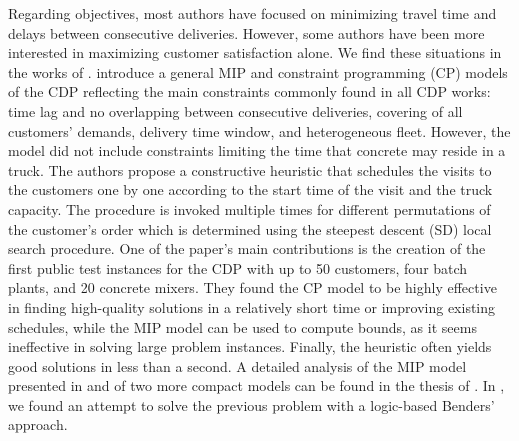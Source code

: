 \documentclass{article}
\begin{document}
Regarding objectives, most authors have focused on minimizing travel time and delays between consecutive deliveries. However, some authors have been more interested in maximizing customer satisfaction alone. We find these situations in the works of \cite{durbin2008or, kinable2014concrete, kinable2014logic, sulaman2017simulated}. \cite{kinable2014concrete} introduce a general MIP and constraint programming (CP) models of the CDP reflecting the main constraints commonly found in all CDP works: time lag and no overlapping between consecutive deliveries, covering of all customers' demands, delivery time window, and heterogeneous fleet. However, the model did not include constraints limiting the time that concrete may reside in a truck. The authors propose a constructive heuristic that schedules the visits to the customers one by one according to the start time of the visit and the truck capacity. The procedure is invoked multiple times for different permutations of the customer's order which is determined using the steepest descent (SD) local search procedure. One of the paper's main contributions is the creation of the first public test instances for the CDP with up to 50 customers, four batch plants, and 20 concrete mixers. They found the CP model to be highly effective in finding high-quality solutions in a relatively short time or improving existing schedules, while the MIP model can be used to compute bounds, as it seems ineffective in solving large problem instances. Finally, the heuristic often yields good solutions in less than a second. A detailed analysis of the MIP model presented in \cite{kinable2014concrete} and of two more compact models can be found in the thesis of \cite{hernandez_lopez_study_2020}. In \cite{kinable2014logic}, we found an attempt to solve the previous problem with a logic-based Benders' approach. %
\end{document}
